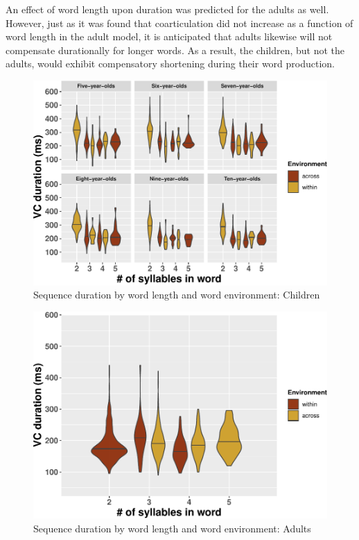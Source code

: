 \documentclass[a4paper,man,floatsintext,natbib,donotrepeattitle, apacite]{apa6}
\begin{document}
An effect of word length upon duration was predicted for the adults as well. However, just as it was found that coarticulation did not increase as a function of word length in the adult model, it is anticipated that adults likewise will not compensate durationally for longer words. As a result, the children, but not the adults, would exhibit compensatory shortening during their word production.

\begin{figure}
\centering
\includegraphics{3_ch3_results_files/figure-latex/compshort-kids-1.pdf}
\caption{\label{fig:compshort-kids}Sequence duration by word length and word environment: Children}
\end{figure}

\begin{figure}
\centering
\includegraphics{3_ch3_results_files/figure-latex/compshort-adults-1.pdf}
\caption{\label{fig:compshort-adults}Sequence duration by word length and word environment: Adults}
\end{figure}
\end{document}
